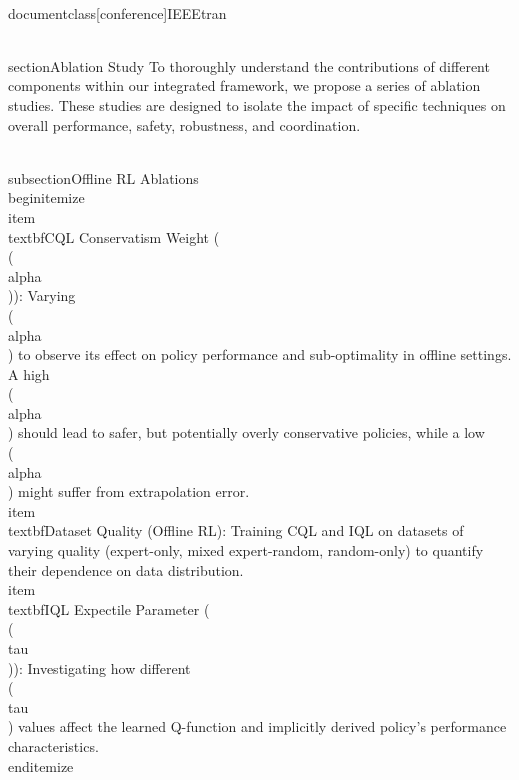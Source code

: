 \\documentclass[conference]{IEEEtran}
\begin{document}
\\section{Ablation Study}
To thoroughly understand the contributions of different components within our integrated framework, we propose a series of ablation studies. These studies are designed to isolate the impact of specific techniques on overall performance, safety, robustness, and coordination.

\\subsection{Offline RL Ablations}
\\begin{itemize}
    \\item \\textbf{CQL Conservatism Weight (\\(\\alpha\\)):} Varying \\(\\alpha\\) to observe its effect on policy performance and sub-optimality in offline settings. A high \\(\\alpha\\) should lead to safer, but potentially overly conservative policies, while a low \\(\\alpha\\) might suffer from extrapolation error.
    \\item \\textbf{Dataset Quality (Offline RL):} Training CQL and IQL on datasets of varying quality (expert-only, mixed expert-random, random-only) to quantify their dependence on data distribution.
    \\item \\textbf{IQL Expectile Parameter (\\(\\tau\\)):} Investigating how different \\(\\tau\\) values affect the learned Q-function and implicitly derived policy's performance characteristics.
\\end{itemize}
\end{document}

